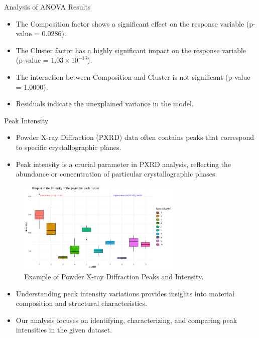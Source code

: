 \documentclass[aspectratio=169]{beamer}
\begin{document}
\begin{frame}{Analysis of ANOVA Results}
  \begin{itemize}
    \item The Composition factor shows a significant effect on the response variable (p-value = 0.0286).
    \item The Cluster factor has a highly significant impact on the response variable (p-value = $1.03 \times 10^{-13}$).
    \item The interaction between Composition and Cluster is not significant (p-value = 1.0000).
    \item Residuals indicate the unexplained variance in the model.
  \end{itemize}
\end{frame}


\begin{frame}{Peak Intensity}
    \begin{itemize}
        \item Powder X-ray Diffraction (PXRD) data often contains peaks that correspond to specific crystallographic planes.
        \item Peak intensity is a crucial parameter in PXRD analysis, reflecting the abundance or concentration of particular crystallographic phases.
    \end{itemize}

    \begin{figure}
        \includegraphics[width=0.7\textwidth]{../plot/intensity.png}
        \caption{Example of Powder X-ray Diffraction Peaks and Intensity.}
    \end{figure}

    \begin{itemize}
        \item Understanding peak intensity variations provides insights into material composition and structural characteristics.
        \item Our analysis focuses on identifying, characterizing, and comparing peak intensities in the given dataset.
    \end{itemize}
\end{frame}
\end{document}

